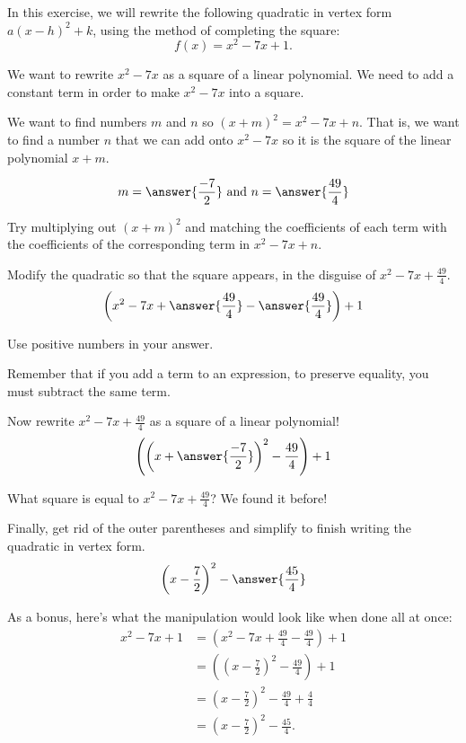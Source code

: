 \documentclass{ximera}
\author{Kenneth Berglund}
\begin{document}
In this exercise, we will rewrite the following quadratic in vertex form $a(x - h)^2 + k$, using the method of completing the square:
\[
f(x)=x^2-7x+1.
\]

\begin{exercise}
We want to rewrite $x^2 - 7x$ as a square of a linear polynomial. We need to add a constant term in order to make $x^2 - 7x$ into a square. 

We want to find numbers $m$ and $n$ so $(x + m)^2 = x^2 - 7x + n$. That is, we want to find a number $n$ that we can add onto $x^2 - 7x$ so it is the square of the linear polynomial $x + m$. 

$$
m = \answer{\frac{-7}{2}} \text{ and } n = \answer{\frac{49}{4}}
$$
\begin{hint}
Try multiplying out $(x + m)^2$ and matching the coefficients of each term with the coefficients of the corresponding term in $x^2 - 7x + n$. 
\end{hint}


\begin{exercise}
Modify the quadratic so that the square appears, in the disguise of $x^2 - 7x + \frac{49}{4}$.
$$
\left(x^2 - 7x + \answer{\frac{49}{4}} - \answer{\frac{49}{4}}\right) +1
$$ 

Use positive numbers in your answer.

\begin{hint}
Remember that if you add a term to an expression, to preserve equality, you must subtract the same term.
\end{hint}

\begin{exercise}
Now rewrite $x^2 - 7x + \frac{49}{4}$ as a square of a linear polynomial!
$$
\left(\left(x + \answer{\frac{-7}{2}}\right)^2 - \frac{49}{4}\right) +1
$$ 
\begin{hint}
What square is equal to $x^2 - 7x + \frac{49}{4}$? We found it before!
\end{hint}

\begin{exercise}
Finally, get rid of the outer parentheses and simplify to finish writing the quadratic in vertex form.
$$
\left(x -\frac{7}{2}\right)^2 - \answer{\frac{45}{4}}
$$ 

\begin{exercise}
As a bonus, here's what the manipulation would look like when done all at once:
\begin{align*}
x^2 - 7x +1 & = \left(x^2 - 7x + \frac{49}{4} - \frac{49}{4}\right) +1 \\
& = \left(\left(x - \frac{7}{2}\right)^2 - \frac{49}{4}\right) +1 \\
& = \left(x -\frac{7}{2}\right)^2 - \frac{49}{4} +\frac{4}{4}\\
& =\left(x -\frac{7}{2}\right)^2 - \frac{45}{4}.
\end{align*}
\end{exercise}
\end{exercise}
\end{exercise}
\end{exercise}
\end{exercise}
\end{document}
